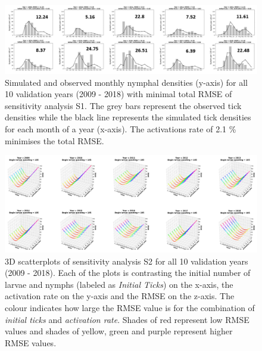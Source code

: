\documentclass[a4paper, 11pt]{scrartcl}
\begin{document}
\begin{figure}
\centering
\includegraphics[width=1.0\textwidth]{figures/initial_ticks_with_beech}
\caption{Simulated and observed monthly nymphal densities (y-axis) for all 10 validation years (2009 - 2018) with minimal total RMSE of sensitivity analysis S1. The grey bars
represent the observed tick densities while the black line represents the simulated tick densities for each month of a year (x-axis). The activations rate of 2.1 \% minimises
the total RMSE.}
\label{fig:initial_ticks_with_beech_rotated}
\end{figure}

\begin{figure}
\centering
\includegraphics[width=1.0\textwidth]{figures/initial_ticks_without_beech_error}
\caption{3D scatterplots of sensitivity analysis S2 for all 10 validation years (2009 - 2018). Each of the plots is contrasting the initial number of larvae and nymphs
(labeled as \textit{Initial Ticks}) on the x-axis, the activation rate on the y-axis and the RMSE on the z-axis. The colour indicates how large the RMSE value is for the
combination of \textit{initial ticks} and \textit{activation rate}. Shades of red represent low RMSE values and shades of yellow, green and purple represent higher RMSE values.}
\label{fig:initial_ticks_without_beech_error_rotated}
\end{figure}
\end{document}
